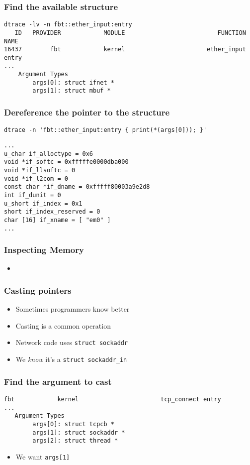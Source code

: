 \documentclass[pdftex]{beamer}
\begin{document}
\begin{frame}[fragile]
  \frametitle{Find the available structure}
\begin{lstlisting}
dtrace -lv -n fbt::ether_input:entry
   ID   PROVIDER            MODULE                          FUNCTION NAME
16437        fbt            kernel                       ether_input entry
...
	Argument Types
		args[0]: struct ifnet *
		args[1]: struct mbuf *

\end{lstlisting}
\end{frame}

\begin{frame}[fragile]
  \frametitle{Dereference the pointer to the structure}
\begin{lstlisting}
dtrace -n 'fbt::ether_input:entry { print(*(args[0])); }'
\end{lstlisting}
\begin{lstlisting}
...
u_char if_alloctype = 0x6
void *if_softc = 0xfffffe0000dba000
void *if_llsoftc = 0
void *if_l2com = 0
const char *if_dname = 0xfffff80003a9e2d8
int if_dunit = 0
u_short if_index = 0x1
short if_index_reserved = 0
char [16] if_xname = [ "em0" ]
...
\end{lstlisting}
\end{frame}

\begin{frame}
  \frametitle{Inspecting Memory}
  \begin{itemize}
  \item 
  \end{itemize}
\end{frame}

\begin{frame}[fragile]
  \frametitle{Casting pointers}
  \begin{itemize}
  \item Sometimes programmers know better
  \item Casting is a common operation
  \item Network code uses \verb+struct sockaddr+
  \item We \emph{know} it's a \verb+struct sockaddr_in+
  \end{itemize}
\end{frame}

\begin{frame}[fragile]
  \frametitle{Find the argument to cast}
\begin{lstlisting}
fbt            kernel                       tcp_connect entry
...
   Argument Types
        args[0]: struct tcpcb *
        args[1]: struct sockaddr *
        args[2]: struct thread *
\end{lstlisting}
  \begin{itemize}
  \item We want \verb+args[1]+
  \end{itemize}
\end{frame}
\end{document}
